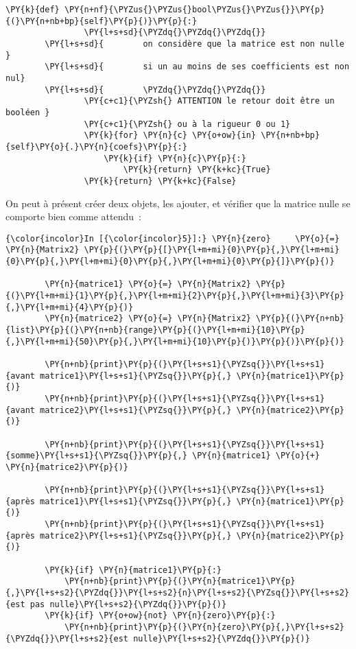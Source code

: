 \begin{Verbatim}[commandchars=\\\{\}]
            \PY{k}{def} \PY{n+nf}{\PYZus{}\PYZus{}bool\PYZus{}\PYZus{}}\PY{p}{(}\PY{n+nb+bp}{self}\PY{p}{)}\PY{p}{:}
                \PY{l+s+sd}{\PYZdq{}\PYZdq{}\PYZdq{}}
        \PY{l+s+sd}{        on considère que la matrice est non nulle }
        \PY{l+s+sd}{        si un au moins de ses coefficients est non nul}
        \PY{l+s+sd}{        \PYZdq{}\PYZdq{}\PYZdq{}}
                \PY{c+c1}{\PYZsh{} ATTENTION le retour doit être un booléen }
                \PY{c+c1}{\PYZsh{} ou à la rigueur 0 ou 1}
                \PY{k}{for} \PY{n}{c} \PY{o+ow}{in} \PY{n+nb+bp}{self}\PY{o}{.}\PY{n}{coefs}\PY{p}{:}
                    \PY{k}{if} \PY{n}{c}\PY{p}{:}
                        \PY{k}{return} \PY{k+kc}{True}
                \PY{k}{return} \PY{k+kc}{False}
\end{Verbatim}


    On peut à présent créer deux objets, les ajouter, et vérifier que la
matrice nulle se comporte bien comme attendu~:

    \begin{Verbatim}[commandchars=\\\{\}]
{\color{incolor}In [{\color{incolor}5}]:} \PY{n}{zero}     \PY{o}{=} \PY{n}{Matrix2} \PY{p}{(}\PY{p}{[}\PY{l+m+mi}{0}\PY{p}{,}\PY{l+m+mi}{0}\PY{p}{,}\PY{l+m+mi}{0}\PY{p}{,}\PY{l+m+mi}{0}\PY{p}{]}\PY{p}{)}
        
        \PY{n}{matrice1} \PY{o}{=} \PY{n}{Matrix2} \PY{p}{(}\PY{l+m+mi}{1}\PY{p}{,}\PY{l+m+mi}{2}\PY{p}{,}\PY{l+m+mi}{3}\PY{p}{,}\PY{l+m+mi}{4}\PY{p}{)}
        \PY{n}{matrice2} \PY{o}{=} \PY{n}{Matrix2} \PY{p}{(}\PY{n+nb}{list}\PY{p}{(}\PY{n+nb}{range}\PY{p}{(}\PY{l+m+mi}{10}\PY{p}{,}\PY{l+m+mi}{50}\PY{p}{,}\PY{l+m+mi}{10}\PY{p}{)}\PY{p}{)}\PY{p}{)}
        
        \PY{n+nb}{print}\PY{p}{(}\PY{l+s+s1}{\PYZsq{}}\PY{l+s+s1}{avant matrice1}\PY{l+s+s1}{\PYZsq{}}\PY{p}{,} \PY{n}{matrice1}\PY{p}{)}
        \PY{n+nb}{print}\PY{p}{(}\PY{l+s+s1}{\PYZsq{}}\PY{l+s+s1}{avant matrice2}\PY{l+s+s1}{\PYZsq{}}\PY{p}{,} \PY{n}{matrice2}\PY{p}{)}
        
        \PY{n+nb}{print}\PY{p}{(}\PY{l+s+s1}{\PYZsq{}}\PY{l+s+s1}{somme}\PY{l+s+s1}{\PYZsq{}}\PY{p}{,} \PY{n}{matrice1} \PY{o}{+} \PY{n}{matrice2}\PY{p}{)}
        
        \PY{n+nb}{print}\PY{p}{(}\PY{l+s+s1}{\PYZsq{}}\PY{l+s+s1}{après matrice1}\PY{l+s+s1}{\PYZsq{}}\PY{p}{,} \PY{n}{matrice1}\PY{p}{)}
        \PY{n+nb}{print}\PY{p}{(}\PY{l+s+s1}{\PYZsq{}}\PY{l+s+s1}{après matrice2}\PY{l+s+s1}{\PYZsq{}}\PY{p}{,} \PY{n}{matrice2}\PY{p}{)}
        
        \PY{k}{if} \PY{n}{matrice1}\PY{p}{:} 
            \PY{n+nb}{print}\PY{p}{(}\PY{n}{matrice1}\PY{p}{,}\PY{l+s+s2}{\PYZdq{}}\PY{l+s+s2}{n}\PY{l+s+s2}{\PYZsq{}}\PY{l+s+s2}{est pas nulle}\PY{l+s+s2}{\PYZdq{}}\PY{p}{)}
        \PY{k}{if} \PY{o+ow}{not} \PY{n}{zero}\PY{p}{:} 
            \PY{n+nb}{print}\PY{p}{(}\PY{n}{zero}\PY{p}{,}\PY{l+s+s2}{\PYZdq{}}\PY{l+s+s2}{est nulle}\PY{l+s+s2}{\PYZdq{}}\PY{p}{)}
\end{Verbatim}


